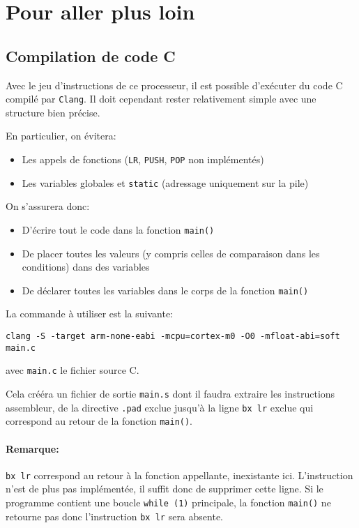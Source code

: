 \documentclass{article}
\begin{document}
    \section{Pour aller plus loin}

    \subsection{Compilation de code C}
    Avec le jeu d'instructions de ce processeur, il est possible d'exécuter du code C compilé par \texttt{Clang}.
    Il doit cependant rester relativement simple avec une structure bien précise.

    En particulier, on évitera:
    \begin{itemize}
        \item Les appels de fonctions (\texttt{LR}, \texttt{PUSH}, \texttt{POP} non implémentés)
        \item Les variables globales et \texttt{static} (adressage uniquement sur la pile)
    \end{itemize}

    On s'assurera donc:
    \begin{itemize}
        \item D'écrire tout le code dans la fonction \texttt{main()}
        \item De placer toutes les valeurs (y compris celles de comparaison dans les conditions) dans des variables
        \item De déclarer toutes les variables dans le corps de la fonction \texttt{main()}
    \end{itemize}

    La commande à utiliser est la suivante:
    \begin{lstlisting}
clang -S -target arm-none-eabi -mcpu=cortex-m0 -O0 -mfloat-abi=soft main.c
    \end{lstlisting}
    avec \texttt{main.c} le fichier source C.

    Cela crééra un fichier de sortie \texttt{main.s} dont il faudra extraire les instructions assembleur,
    de la directive \texttt{.pad} exclue jusqu'à la ligne \texttt{bx lr} exclue qui correspond au retour de la fonction \texttt{main()}.

    \paragraph{Remarque:} \texttt{bx lr} correspond au retour à la fonction appellante, inexistante ici.
    L'instruction n'est de plus pas implémentée, il suffit donc de supprimer cette ligne.
    Si le programme contient une boucle \texttt{while (1)} principale, la fonction \texttt{main()} ne retourne pas donc l'instruction \texttt{bx lr} sera absente.
\end{document}
